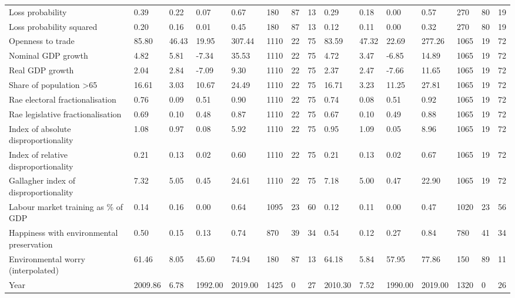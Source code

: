 \begin{longtable}{lllllllllllllll}
\addlinespace
Loss probability & 0.39 & 0.22 & 0.07 & 0.67 & 180 & 87 & 13 & 0.29 & 0.18 & 0.00 & 0.57 & 270 & 80 & 19\\
Loss probability squared & 0.20 & 0.16 & 0.01 & 0.45 & 180 & 87 & 13 & 0.12 & 0.11 & 0.00 & 0.32 & 270 & 80 & 19\\
Openness to trade & 85.80 & 46.43 & 19.95 & 307.44 & 1110 & 22 & 75 & 83.59 & 47.32 & 22.69 & 277.26 & 1065 & 19 & 72\\
Nominal GDP growth & 4.82 & 5.81 & -7.34 & 35.53 & 1110 & 22 & 75 & 4.72 & 3.47 & -6.85 & 14.89 & 1065 & 19 & 72\\
Real GDP growth & 2.04 & 2.84 & -7.09 & 9.30 & 1110 & 22 & 75 & 2.37 & 2.47 & -7.66 & 11.65 & 1065 & 19 & 72\\
\addlinespace
Share of population >65 & 16.61 & 3.03 & 10.67 & 24.49 & 1110 & 22 & 75 & 16.71 & 3.23 & 11.25 & 27.81 & 1065 & 19 & 72\\
Rae electoral fractionalisation & 0.76 & 0.09 & 0.51 & 0.90 & 1110 & 22 & 75 & 0.74 & 0.08 & 0.51 & 0.92 & 1065 & 19 & 72\\
Rae legislative fractionalisation & 0.69 & 0.10 & 0.48 & 0.87 & 1110 & 22 & 75 & 0.67 & 0.10 & 0.49 & 0.88 & 1065 & 19 & 72\\
Index of absolute disproportionality & 1.08 & 0.97 & 0.08 & 5.92 & 1110 & 22 & 75 & 0.95 & 1.09 & 0.05 & 8.96 & 1065 & 19 & 72\\
Index of relative disproportionality & 0.21 & 0.13 & 0.02 & 0.60 & 1110 & 22 & 75 & 0.21 & 0.13 & 0.02 & 0.67 & 1065 & 19 & 72\\
\addlinespace
Gallagher index of disproportionality & 7.32 & 5.05 & 0.45 & 24.61 & 1110 & 22 & 75 & 7.18 & 5.00 & 0.47 & 22.90 & 1065 & 19 & 72\\
Labour market training as \% of GDP & 0.14 & 0.16 & 0.00 & 0.64 & 1095 & 23 & 60 & 0.12 & 0.11 & 0.00 & 0.47 & 1020 & 23 & 56\\
Happiness with environmental preservation & 0.50 & 0.15 & 0.13 & 0.74 & 870 & 39 & 34 & 0.54 & 0.12 & 0.27 & 0.84 & 780 & 41 & 34\\
Environmental worry (interpolated) & 61.46 & 8.05 & 45.60 & 74.94 & 180 & 87 & 13 & 64.18 & 5.84 & 57.95 & 77.86 & 150 & 89 & 11\\
Year & 2009.86 & 6.78 & 1992.00 & 2019.00 & 1425 & 0 & 27 & 2010.30 & 7.52 & 1990.00 & 2019.00 & 1320 & 0 & 26\\
\bottomrule
\end{longtable}
